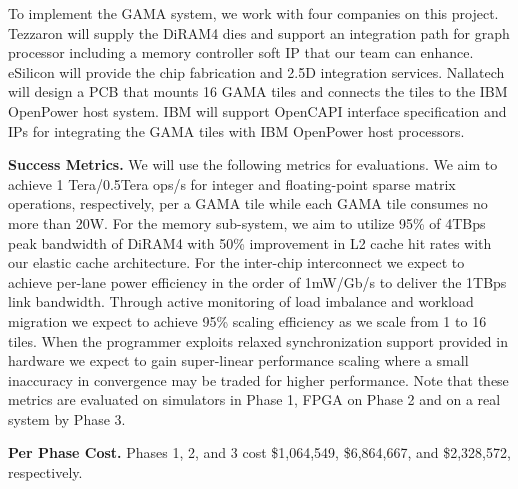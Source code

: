 

To implement the GAMA system, %
we work with 
four companies on this project. 
Tezzaron will supply the DiRAM4 dies and support an integration path for graph processor including a memory controller soft IP that our team can enhance.
eSilicon will provide the chip fabrication and 2.5D integration services.
Nallatech will design a PCB that mounts 16 GAMA tiles and connects the tiles to the IBM OpenPower host system. %
IBM will support OpenCAPI interface specification and IPs for integrating the GAMA tiles with IBM OpenPower host processors. 

\vspace{3pt}
\noindent
\textbf{Success Metrics.} 
We will use the following metrics for evaluations.
We aim to achieve 1 Tera/0.5Tera ops/s for integer and floating-point sparse matrix operations, respectively, per a GAMA tile while each GAMA tile consumes no more than 20W.
For the memory sub-system, we aim to utilize 95\% of 4TBps peak bandwidth of DiRAM4 with 50\% improvement in L2 cache hit rates with our elastic cache architecture.
For the inter-chip interconnect we expect to achieve per-lane power efficiency in the order of 1mW/Gb/s to deliver the 1TBps link bandwidth. %
Through active monitoring of load imbalance and workload migration we expect to achieve 95\% scaling efficiency as we scale from 1 to 16 tiles. 
When the programmer exploits relaxed synchronization support provided in hardware  we expect to gain super-linear performance scaling where a small inaccuracy in convergence may be traded for higher performance.  
Note that these metrics are evaluated on simulators in Phase 1, FPGA on Phase 2 and on a real system by Phase 3.  


\vspace{3pt}
\noindent
\textbf{Per Phase Cost.} 
Phases 1, 2, and 3 cost \$1,064,549, \$6,864,667, and \$2,328,572, respectively.

